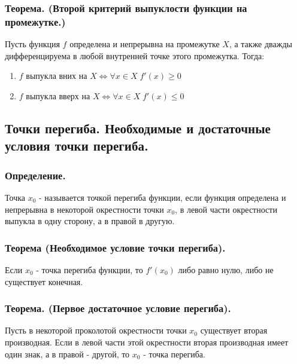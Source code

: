 \documentclass[a4paper,12pt]{article}
\theoremstyle{plain} %
\theoremstyle{definition} %
\theoremstyle{remark} %
\begin{document}
\subsubsection*{Теорема. (Второй критерий выпуклости функции на промежутке.)}
Пусть функция $f$ определена и непрерывна на промежутке $X$, а также дважды дифференцируема в любой внутренней точке этого промежутка.
Тогда:

\begin{enumerate}
	\item $f$ выпукла вних на $X \Leftrightarrow \forall x \in X \;  f'(x) \geq 0$
	\item $f$ выпукла вверх на $X \Leftrightarrow \forall x \in X \; f'(x) \leq 0$
\end{enumerate}








\newpage
{}
\subsection*{Точки перегиба. Необходимые и достаточные условия точки перегиба.                                        }

\subsubsection*{Определение.}
Точка $x_0$ - называется точкой перегиба функции, если функция определена и непрерывна в некоторой окрестности точки $x_0$, в левой части окрестности выпукла в одну сторону, а в правой в другую.

\subsubsection*{Теорема (Необходимое условие точки перегиба).}
Если $x_0$ - точка перегиба функции, то $f'(x_0)$ либо равно нулю, либо не существует конечная.

\subsubsection*{Теорема. (Первое достаточное условие перегиба).}
Пусть в некоторой проколотой окрестности точки $x_0$ существует вторая производная. Если в левой части этой окрестности вторая производная имеет один знак, а в правой - другой, то $x_0$ - точка перегиба.
\end{document}
